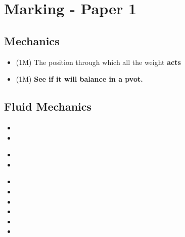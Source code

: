 \documentclass[a4paper]{article}
\begin{document}
\maketitle


\tableofcontents

\section{Marking - Paper 1}
\subsection{Mechanics}
\begin{concept}
\end{concept}
\begin{itemize}
\item (1M) The position through which all the weight \textbf{acts} 
\item (1M) \textbf{See if it will balance in a pvot.} 
\end{itemize}

\subsection{Fluid Mechanics}

\begin{concept}
\end{concept}
\begin{itemize}
\item 
\item 
\end{itemize}

\begin{concept}
\end{concept}
\begin{itemize}
\item 
\item 
\end{itemize}


\begin{concept}
\end{concept}
\begin{itemize}
\item
\item
\item
\item
\item
\item
\end{itemize}
\end{document}
